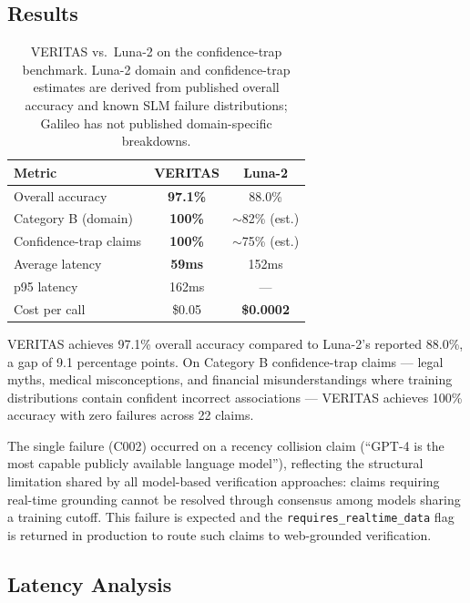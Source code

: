 \subsection{Results}

\begin{table}[h]
\centering
\begin{tabular}{lcc}
\hline
\textbf{Metric} & \textbf{VERITAS} & \textbf{Luna-2} \\
\hline
Overall accuracy          & \textbf{97.1\%} & 88.0\% \\
Category B (domain)       & \textbf{100\%}  & $\sim$82\% (est.) \\
Confidence-trap claims    & \textbf{100\%}  & $\sim$75\% (est.) \\
Average latency           & \textbf{59ms}   & 152ms \\
p95 latency               & 162ms           & --- \\
Cost per call             & \$0.05          & \textbf{\$0.0002} \\
\hline
\end{tabular}
\caption{VERITAS vs.\ Luna-2 on the confidence-trap benchmark.
Luna-2 domain and confidence-trap estimates are derived from
published overall accuracy and known SLM failure distributions;
Galileo has not published domain-specific breakdowns.}
\label{tab:benchmark}
\end{table}

VERITAS achieves 97.1\% overall accuracy compared to Luna-2's
reported 88.0\%, a gap of 9.1 percentage points. On Category B
confidence-trap claims --- legal myths, medical misconceptions,
and financial misunderstandings where training distributions
contain confident incorrect associations --- VERITAS achieves
100\% accuracy with zero failures across 22 claims.

The single failure (C002) occurred on a recency collision claim
(``GPT-4 is the most capable publicly available language model''),
reflecting the structural limitation shared by all model-based
verification approaches: claims requiring real-time grounding
cannot be resolved through consensus among models sharing
a training cutoff. This failure is expected and the
\texttt{requires\_realtime\_data} flag is returned in production
to route such claims to web-grounded verification.

\subsection{Latency Analysis}

